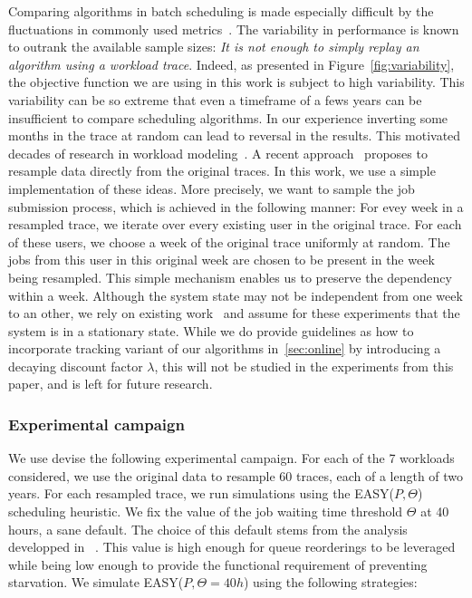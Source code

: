 \documentclass[sigconf,anonymous]{acmart}
\begin{document}
Comparing algorithms in batch scheduling is made especially difficult by the
fluctuations in commonly used metrics~\cite{jsm}. The variability in
performance is known to outrank the available sample sizes: \textit{It is not
enough to simply replay an algorithm using a workload trace}. Indeed, as
presented in Figure~\ref{fig:variability}, the objective function we are using
in this work is subject to high variability. This variability can be so extreme
that even a timeframe of a fews years can be insufficient to compare scheduling
algorithms. In our experience inverting some months in the trace at random can
lead to reversal in the results. This motivated decades of research in workload
modeling~\cite{feitbook}. A recent approach~\cite{feitresampling} proposes to
resample data directly from the original traces. In this work, we use a simple
implementation of these ideas.  More precisely, we want to sample the job
submission process, which is achieved in the following manner: For evey week in
a resampled trace, we iterate over every existing user in the original trace.
For each of these users, we choose a week of the original trace uniformly at
random. The jobs from this user in this original week are chosen to be present
in the week being resampled.  This simple mechanism enables us to preserve the
dependency within a week.  Although the system state may not be independent
from one week to an other, we rely on existing work~\cite{jsspp17} and assume
for these experiments that the system is in a stationary state. While we
do provide guidelines as how to incorporate tracking variant of our algorithms
in~\ref{sec:online} by introducing a decaying discount factor $\lambda$,
this will not be studied in the experiments from this paper, and is left for
future research.


\subsubsection{Experimental campaign}

We use devise the following experimental campaign. For each of the 7 workloads
considered, we use the original data to resample 60 traces, each of a length
of two years. For each resampled trace, we run simulations using the
EASY($P,\Theta$) scheduling heuristic. We fix the value of the job waiting time
threshold $\Theta$ at 40 hours, a sane default. The choice of this default
stems from the analysis developped in ~\cite{jsspp17}. This value is high
enough for queue reorderings to be leveraged while being low enough to provide
the functional requirement of preventing starvation. We simulate
EASY($P,\Theta=40h$) using the following strategies:
\end{document}
